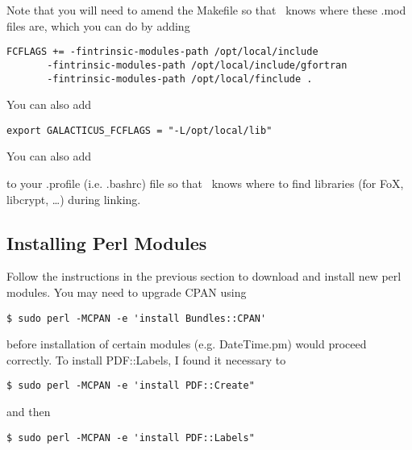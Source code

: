 Note that you will need to amend the {\normalfont \ttfamily Makefile} so that \glc\ knows where these {\normalfont \ttfamily .mod} files are, which you can do by adding

\begin{verbatim}
FCFLAGS += -fintrinsic-modules-path /opt/local/include 
	   -fintrinsic-modules-path /opt/local/include/gfortran
	   -fintrinsic-modules-path /opt/local/finclude .
\end{verbatim}

You can also add

\begin{verbatim}
export GALACTICUS_FCFLAGS = "-L/opt/local/lib"
\end{verbatim}

You can also add

to your {\normalfont \ttfamily .profile} (i.e. {\normalfont \ttfamily .bashrc}) file so that \glc\ knows where to find libraries (for FoX, {\normalfont \ttfamily libcrypt}, \ldots) during linking.

\subsection{Installing Perl Modules}

Follow the instructions in the previous section to download and install new {\normalfont \ttfamily perl} modules. You may need to upgrade CPAN using

\begin{verbatim}
$ sudo perl -MCPAN -e 'install Bundles::CPAN'
\end{verbatim}

before installation of certain modules (e.g. {\normalfont \ttfamily DateTime.pm}) would proceed correctly. To install {\normalfont \ttfamily PDF::Labels}, I found it necessary to

\begin{verbatim}
$ sudo perl -MCPAN -e 'install PDF::Create"
\end{verbatim}

and then

\begin{verbatim}
$ sudo perl -MCPAN -e 'install PDF::Labels"
\end{verbatim}
